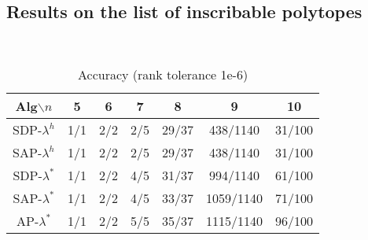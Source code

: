 \documentclass[smallextended, envcountsame]{svjour3}
\begin{document}
\subsection{Results on the list of inscribable polytopes}~
\begin{table}[!htb]
    \caption{Accuracy (rank tolerance 1e-6)}
    \centering
    \begin{tabular}{ccccccc}
    \hline
    Alg$\backslash n$ & 5 & 6 & 7 & 8 & 9 & 10 \\ \hline
    SDP-$\lambda^h$ & 1/1 & 2/2 & 2/5 & 29/37 & 438/1140 & 31/100 \\
    SAP-$\lambda^h$ & 1/1 & 2/2 & 2/5 & 29/37 & 438/1140 & 31/100 \\
    SDP-$\lambda^*$ & 1/1 & 2/2 & 4/5 & 31/37 & 994/1140 & 61/100\\ 
    SAP-$\lambda^*$ & 1/1 & 2/2 & 4/5 & 33/37 & 1059/1140 & 71/100\\ 
    AP-$\lambda^*$ & 1/1 & 2/2 & 5/5 & 35/37 & 1115/1140 & 96/100\\ 
    \hline
    \end{tabular}
\end{table}\FloatBarrier
\end{document}
